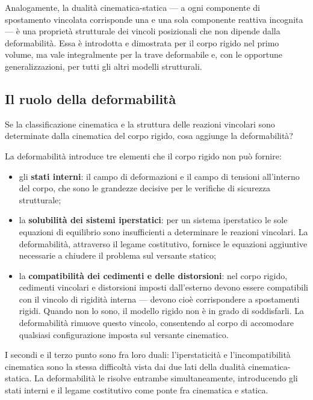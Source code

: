 Analogamente, la dualità cinematica-statica --- a ogni componente di spostamento vincolata corrisponde una e una sola componente reattiva incognita --- è una proprietà strutturale dei vincoli posizionali che non dipende dalla deformabilità. Essa è introdotta e dimostrata per il corpo rigido nel primo volume, ma vale integralmente per la trave deformabile e, con le opportune generalizzazioni, per tutti gli altri modelli strutturali.

\subsection{Il ruolo della deformabilità}

Se la classificazione cinematica e la struttura delle reazioni vincolari sono determinate dalla cinematica del corpo rigido, cosa aggiunge la deformabilità?

La deformabilità introduce tre elementi che il corpo rigido non può fornire:

\begin{itemize}[nosep]
	\item gli \textbf{stati interni}: il campo di deformazioni e il campo di tensioni all'interno del corpo, che sono le grandezze decisive per le verifiche di sicurezza strutturale;
	\item la \textbf{solubilità dei sistemi iperstatici}: per un sistema iperstatico le sole equazioni di equilibrio sono insufficienti a determinare le reazioni vincolari. La deformabilità, attraverso il legame costitutivo, fornisce le equazioni aggiuntive necessarie a chiudere il problema sul versante statico;
	\item la \textbf{compatibilità dei cedimenti e delle distorsioni}: nel corpo rigido, cedimenti vincolari e distorsioni imposti dall'esterno devono essere compatibili con il vincolo di rigidità interna --- devono cioè corrispondere a spostamenti rigidi. Quando non lo sono, il modello rigido non è in grado di soddisfarli. La deformabilità rimuove questo vincolo, consentendo al corpo di accomodare qualsiasi configurazione imposta sul versante cinematico.
\end{itemize}

I secondi e il terzo punto sono fra loro duali: l'iperstaticità e l'incompatibilità cinematica sono la stessa difficoltà vista dai due lati della dualità cinematica-statica. La deformabilità le risolve entrambe simultaneamente, introducendo gli stati interni e il legame costitutivo come ponte fra cinematica e statica.

